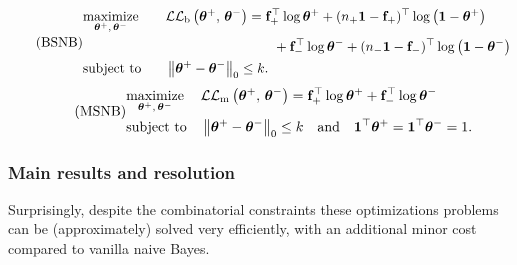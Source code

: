 \begin{equation}\label{eq:bsnb}\tag{BSNB}
\begin{aligned}
    & \underset{\bm{\theta}^+,\, \bm{\theta}^-}{\text{maximize}}
    \quad&&\mathcal{L}\mathcal{L}_\text{b}\left( \bm{\theta}^+,\, \bm{\theta}^- \right)
    = \mathbf{f}_+^\top\log\bm{\theta}^+ + (n_+\mathbf{1} - \mathbf{f}_+)^\top\log\left( \mathbf{1} - \bm{\theta}^+ \right)\\
    & && \qquad\qquad\qquad\qquad + \mathbf{f}_-^\top\log\bm{\theta}^- + (n_-\mathbf{1} - \mathbf{f}_-)^\top\log\left( \mathbf{1} - \bm{\theta}^- \right)\\
    & \text{subject to}
    &&\left\lVert\bm{\theta}^+ - \bm{\theta}^-\right\rVert_0 \leq k.
\end{aligned}
\end{equation}
\vspace{1cm}
\begin{equation}\label{eq:msnb}\tag{MSNB}
\begin{aligned}
    & \underset{\bm{\theta}^+,\, \bm{\theta}^-}{\text{maximize}}
    & & \mathcal{L}\mathcal{L}_\text{m}\left( \bm{\theta}^+,\, \bm{\theta}^- \right) = \mathbf{f}_+^\top\log\bm{\theta}^+ + \mathbf{f}_-^\top\log\bm{\theta}^-\\
    & \text{subject to}
    & & \left\lVert\bm{\theta}^+ - \bm{\theta}^-\right\rVert_0 \leq k
    \quad\text{and}\quad \mathbf{1}^\top\bm{\theta}^+ = \mathbf{1}^\top\bm{\theta}^- = 1.
\end{aligned}
\end{equation}

\subsubsection{Main results and resolution}\label{subsubsec:snb_th}

Surprisingly, despite the combinatorial constraints
these optimizations problems can be (approximately) solved very efficiently,
with an additional minor cost compared to vanilla naive Bayes.


